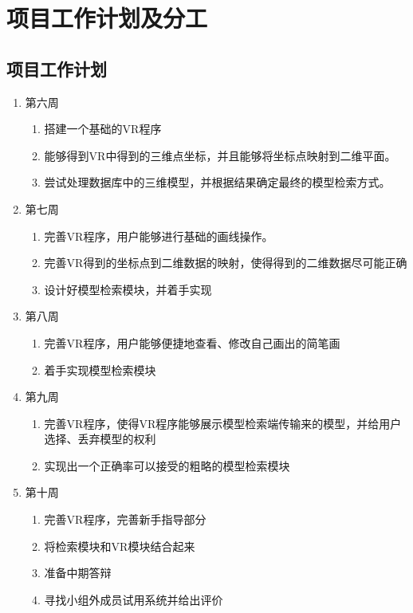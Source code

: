\documentclass{article}
\begin{document}
\section{项目工作计划及分工}
\subsection{项目工作计划}
\begin{enumerate}
    \item 第六周  
    \begin{enumerate}
        \item 搭建一个基础的VR程序 
        \item 能够得到VR中得到的三维点坐标，并且能够将坐标点映射到二维平面。
        \item 尝试处理数据库中的三维模型，并根据结果确定最终的模型检索方式。
    \end{enumerate}
    \item 第七周
    \begin{enumerate}
        \item 完善VR程序，用户能够进行基础的画线操作。
        \item 完善VR得到的坐标点到二维数据的映射，使得得到的二维数据尽可能正确
        \item 设计好模型检索模块，并着手实现
    \end{enumerate}
    \item 第八周
    \begin{enumerate}
        \item 完善VR程序，用户能够便捷地查看、修改自己画出的简笔画
        \item 着手实现模型检索模块
    \end{enumerate}
    \item 第九周
    \begin{enumerate}
        \item 完善VR程序，使得VR程序能够展示模型检索端传输来的模型，并给用户选择、丢弃模型的权利
        \item 实现出一个正确率可以接受的粗略的模型检索模块
    \end{enumerate}
    \item 第十周
    \begin{enumerate}
        \item 完善VR程序，完善新手指导部分
        \item 将检索模块和VR模块结合起来
        \item 准备中期答辩
        \item 寻找小组外成员试用系统并给出评价

\end{enumerate}
\end{enumerate}
\end{document}
